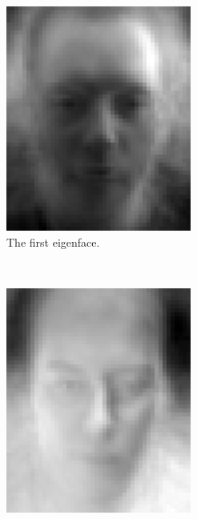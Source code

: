 \documentclass[a4paper, 10pt, conference]{ieeeconf}
\begin{document}
\begin{figure}[!ht]
\begin{subfigure}{0.1\textwidth}
          \includegraphics[width=\textwidth]{src/eigface1.png}
                \caption{The first eigenface.}
                \label{fig:eigface1}
        \end{subfigure}
        ~
        \begin{subfigure}{0.1\textwidth}
          \includegraphics[width=\textwidth]{src/eigface2.png}

\end{subfigure}
\end{figure}
\end{document}
